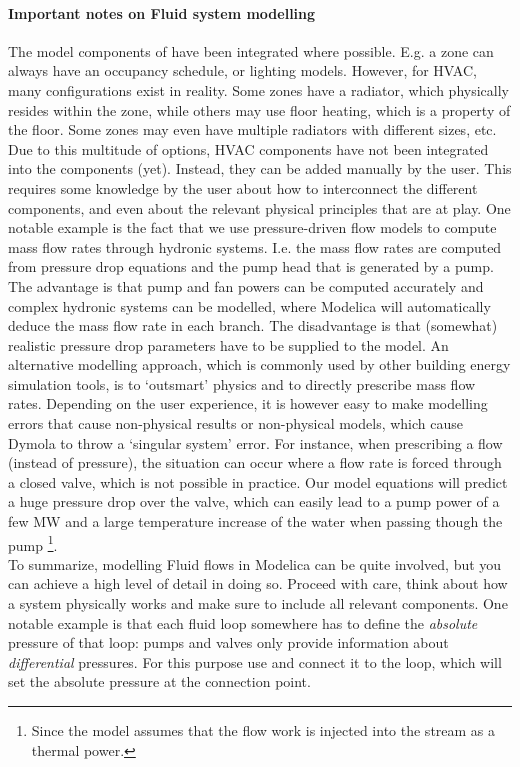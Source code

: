 \documentclass[10pt,a4paper]{article}
\begin{document}
\paragraph{Important notes on Fluid system modelling}
The model components of  have been integrated where possible.
E.g. a zone can always have an occupancy schedule, or lighting models. 
However, for HVAC, many configurations exist in reality. 
Some zones have a radiator, which physically resides within the zone, 
while others may use floor heating, which is a property of the floor.
Some zones may even have multiple radiators with different sizes, etc.
Due to this multitude of options, HVAC components have not been integrated into
the  components (yet).
Instead, they can be added manually by the user.
This requires some knowledge by the user about how to interconnect the different components, 
and even about the relevant physical principles that are at play.
One notable example is the fact that we use pressure-driven flow models 
to compute mass flow rates through hydronic systems. 
I.e. the mass flow rates are computed from pressure drop equations
and the pump head that is generated by a pump.
The advantage is that 
pump and fan powers can be computed accurately and 
complex hydronic systems can be modelled, 
where Modelica will automatically deduce the mass flow rate in each branch.
The disadvantage is that (somewhat) realistic pressure drop parameters have to be supplied
to the model.
An alternative modelling approach, which is commonly used by other building energy simulation tools, 
is to `outsmart' physics and to directly prescribe mass flow rates.
Depending on the user experience, it is however easy to make modelling errors that cause
non-physical results or non-physical models, which cause Dymola to throw a `singular system' error.
For instance, when prescribing a flow (instead of pressure),
the situation can occur where a flow rate is forced
through a closed valve, which is not possible in practice. 
Our model equations will predict a huge
pressure drop over the valve, which can easily lead to a pump power 
of a few MW and a large
temperature increase of the water when passing though the pump
\footnote{Since the model assumes that the flow work 
is injected into the stream as a thermal power.}.\\

To summarize, modelling Fluid flows in Modelica can be quite involved,
but you can achieve a high level of detail in doing so.
Proceed with care, think about how a system physically works and make sure to 
include all relevant components.
One notable example is that each fluid loop somewhere has to define the 
\textit{absolute} pressure of that loop: pumps and valves only provide information
about \textit{differential} pressures. 
For this purpose use  and connect
it to the loop, which will set the absolute pressure at the connection point.
\end{document}
